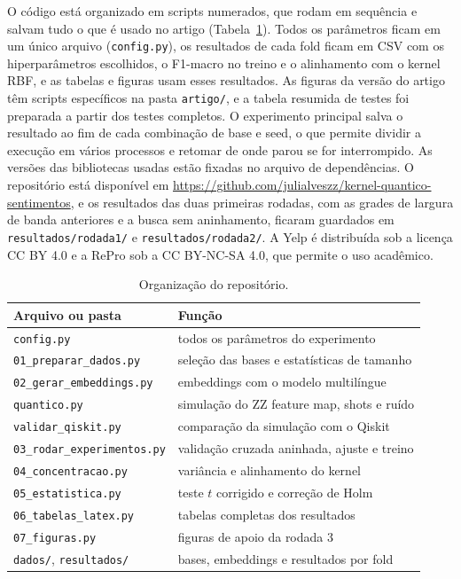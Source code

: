 \documentclass[conference]{IEEEtran}
\begin{document}
O código está organizado em scripts numerados, que rodam em sequência e salvam tudo o que é usado no artigo (Tabela~\ref{tab:codigo}). Todos os parâmetros ficam em um único arquivo (\texttt{config.py}), os resultados de cada fold ficam em CSV com os hiperparâmetros escolhidos, o F1-macro no treino e o alinhamento com o kernel RBF, e as tabelas e figuras usam esses resultados. As figuras da versão do artigo têm scripts específicos na pasta \texttt{artigo/}, e a tabela resumida de testes foi preparada a partir dos testes completos. O experimento principal salva o resultado ao fim de cada combinação de base e seed, o que permite dividir a execução em vários processos e retomar de onde parou se for interrompido. As versões das bibliotecas usadas estão fixadas no arquivo de dependências. O repositório está disponível em \url{https://github.com/julialveszz/kernel-quantico-sentimentos}, e os resultados das duas primeiras rodadas, com as grades de largura de banda anteriores e a busca sem aninhamento, ficaram guardados em \texttt{resultados/rodada1/} e \texttt{resultados/rodada2/}. A Yelp é distribuída sob a licença CC BY 4.0 e a RePro sob a CC BY-NC-SA 4.0, que permite o uso acadêmico.




\begin{table}[t]
\centering
\caption{Organização do repositório.}
\label{tab:codigo}
\footnotesize
\begin{tabular}{p{}p{}}
\toprule
Arquivo ou pasta & Função \\
\midrule
\texttt{config.py} & todos os parâmetros do experimento \\
\texttt{01\_preparar\_dados.py} & seleção das bases e estatísticas de tamanho \\
\texttt{02\_gerar\_embeddings.py} & embeddings com o modelo multilíngue \\
\texttt{quantico.py} & simulação do ZZ feature map, shots e ruído \\
\texttt{validar\_qiskit.py} & comparação da simulação com o Qiskit \\
\texttt{03\_rodar\_experimentos.py} & validação cruzada aninhada, ajuste e treino \\
\texttt{04\_concentracao.py} & variância e alinhamento do kernel \\
\texttt{05\_estatistica.py} & teste $t$ corrigido e correção de Holm \\
\texttt{06\_tabelas\_latex.py} & tabelas completas dos resultados \\
\texttt{07\_figuras.py} & figuras de apoio da rodada 3 \\
\texttt{dados/}, \texttt{resultados/} & bases, embeddings e resultados por fold \\
\bottomrule
\end{tabular}
\end{table}
\end{document}
